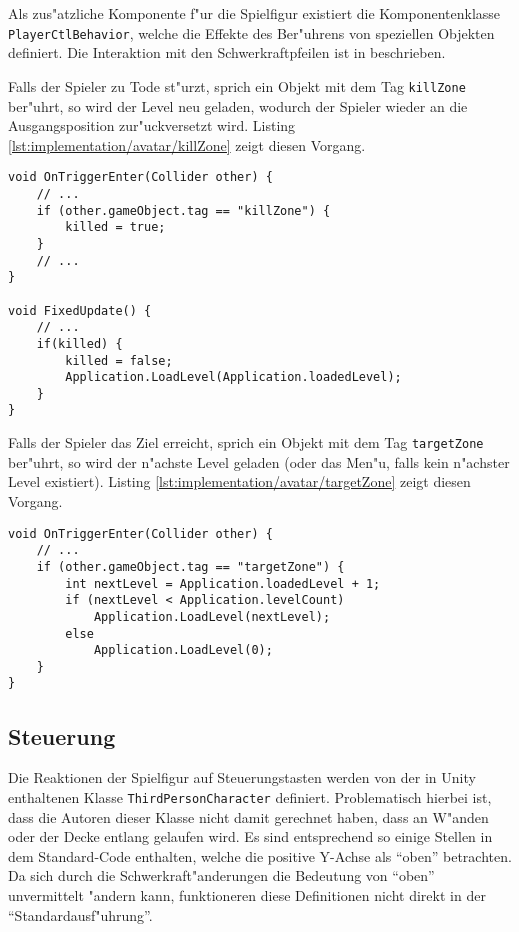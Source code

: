 Als zus"atzliche Komponente f"ur die Spielfigur existiert
die Komponentenklasse \texttt{PlayerCtlBehavior}, welche die Effekte
des Ber"uhrens von speziellen Objekten definiert. Die
Interaktion mit den Schwerkraftpfeilen ist in
 beschrieben.

Falls der Spieler zu Tode st"urzt, sprich ein Objekt mit dem
Tag \texttt{killZone} ber"uhrt, so wird der Level neu geladen,
wodurch der Spieler wieder an die Ausgangsposition zur"uckversetzt
wird. Listing \ref{lst:implementation/avatar/killZone}
zeigt diesen Vorgang.

\begin{lstlisting}[caption={Sterben},label=lst:implementation/avatar/killZone]
void OnTriggerEnter(Collider other) {
    // ...
    if (other.gameObject.tag == "killZone") {
        killed = true;
    }
    // ...
}

void FixedUpdate() {
    // ...
    if(killed) {
        killed = false;
        Application.LoadLevel(Application.loadedLevel);
    }
}
\end{lstlisting}

Falls der Spieler das Ziel erreicht, sprich ein Objekt mit dem
Tag \texttt{targetZone} ber"uhrt, so wird der n"achste Level geladen
(oder das Men"u, falls kein n"achster Level existiert). Listing
\ref{lst:implementation/avatar/targetZone} zeigt diesen
Vorgang.

\begin{lstlisting}[caption={Gewinnen},label=lst:implementation/avatar/targetZone]
void OnTriggerEnter(Collider other) {
    // ...
    if (other.gameObject.tag == "targetZone") {
        int nextLevel = Application.loadedLevel + 1;
        if (nextLevel < Application.levelCount)
            Application.LoadLevel(nextLevel);
        else
            Application.LoadLevel(0);
    }
}
\end{lstlisting}
%
\subsection{Steuerung}
\label{sec:implementation/controls}
%
Die Reaktionen der Spielfigur auf Steuerungstasten werden
von der in Unity enthaltenen Klasse \texttt{ThirdPersonCharacter}
definiert. Problematisch hierbei ist, dass die Autoren dieser
Klasse nicht damit gerechnet haben, dass an W"anden oder der
Decke entlang gelaufen wird. Es sind entsprechend so einige
Stellen in dem Standard-Code enthalten, welche die positive
Y-Achse als ``oben'' betrachten. Da sich durch die
Schwerkraft"anderungen die Bedeutung von ``oben'' unvermittelt
"andern kann, funktioneren diese Definitionen nicht direkt
in der ``Standardausf"uhrung''.

